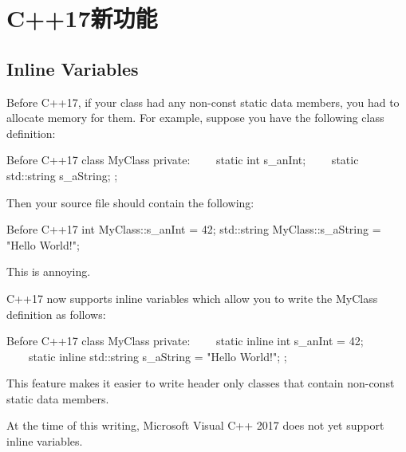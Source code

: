 \chapter{C++17新功能}

\section{Inline Variables}

Before C++17, if your class had any non-const static data members, you had to allocate memory for them. For example, suppose you have the following class definition:

\begin{cppCode}{Before C++17}
class MyClass
{
private:
    static int s_anInt;
    static std::string s_aString;
};
\end{cppCode}

Then your source file should contain the following:

\begin{cppCode}{Before C++17}
int MyClass::s_anInt = 42;
std::string MyClass::s_aString = "Hello World!";
\end{cppCode}

This is annoying.

C++17 now supports inline variables which allow you to write the MyClass definition as follows:

\begin{cppCode}{Before C++17}
class MyClass
{
private:
    static inline int s_anInt = 42;
    static inline std::string s_aString = "Hello World!";
};
\end{cppCode}

This feature makes it easier to write header only classes that contain non-const static data members.

At the time of this writing, Microsoft Visual C++ 2017 does not yet support inline variables.